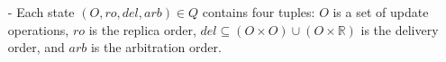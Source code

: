 \begin{itemize}
\setlength{\itemsep}{0.5pt}
\item[-] Each state $(O,\mathit{ro},\mathit{del},\mathit{arb}) \in Q$ contains four tuples: $O$ is a set of update operations, $\mathit{ro}$ is the replica order, $\mathit{del} \subseteq (O \times O) \cup (O \times \mathbb{R})$ is the delivery order, and $\mathit{arb}$ is the arbitration order.







\end{itemize}
